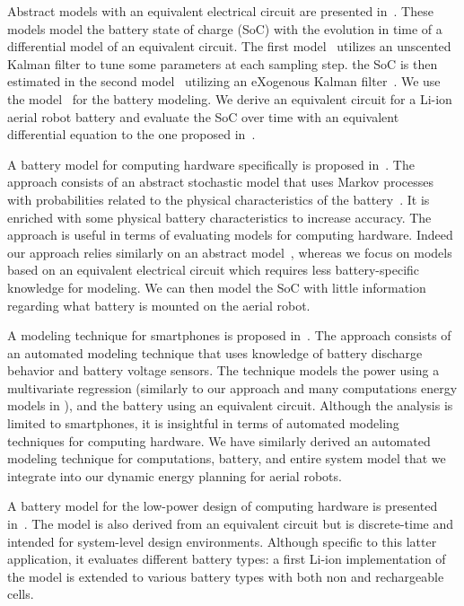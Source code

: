 Abstract models with an equivalent electrical circuit are presented in~\citep{xing2014state,hasan2018exogenous}. These models model the battery state of charge (SoC) with the evolution in time of a differential model of an equivalent circuit. The first model~\citep{xing2014state} utilizes an unscented Kalman filter to tune some parameters at each sampling step. the SoC is then estimated in the second model~\citep{hasan2018exogenous} utilizing an eXogenous Kalman filter~\citep{johansen2017exogenous}. We use the model~\citep{hasan2018exogenous} for the battery modeling. We derive an equivalent circuit for a Li-ion aerial robot battery and evaluate the SoC over time with an equivalent differential equation to the one proposed in~\citep{hasan2018exogenous}. 

A battery model for computing hardware specifically is proposed in~\citep{rao2005battery}. The approach consists of an abstract stochastic model that uses Markov processes with probabilities related to the physical characteristics of the battery~\citep{panigrahi2001battery}. It is enriched with some physical battery characteristics to increase accuracy. The approach is useful in terms of evaluating models for computing hardware. Indeed our approach relies similarly on an abstract model~\citep{hasan2018exogenous}, whereas we focus on models based on an equivalent electrical circuit which requires less battery-specific knowledge for modeling. We can then model the SoC with little information regarding what battery is mounted on the aerial robot. 

A modeling technique for smartphones is proposed in~\citep{zhang2010accurate}. The approach consists of an automated modeling technique that uses knowledge of battery discharge behavior and battery voltage sensors. The technique models the power using a multivariate regression (similarly to our approach and many computations energy models in ), and the battery using an equivalent circuit. Although the analysis is limited to smartphones, it is insightful in terms of automated modeling techniques for computing hardware. We have similarly derived an automated modeling technique for computations, battery, and entire system model that we integrate into our dynamic energy planning for aerial robots.

A battery model for the low-power design of computing hardware is presented in~\citep{benini2001discrete}. The model is also derived from an equivalent circuit but is discrete-time and intended for system-level design environments. Although specific to this latter application, it evaluates different battery types: a first Li-ion implementation of the model is extended to various battery types with both non and rechargeable cells. 





